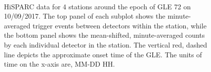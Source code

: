 \begin{figure}[ht!]
	\centering
	 \\
	
	\qquad
	
	
	\caption{HiSPARC data for 4 stations around the epoch of GLE 72 on 10/09/2017. The top panel of each subplot shows the minute-averaged trigger events between detectors within the station, while the bottom panel shows the mean-shifted, minute-averaged counts by each individual detector in the station. The vertical red, dashed line depicts the approximate onset time of the GLE. The units of time on the x-axis are, MM-DD HH.}
	\label{fig:GLE_72}
\end{figure}


